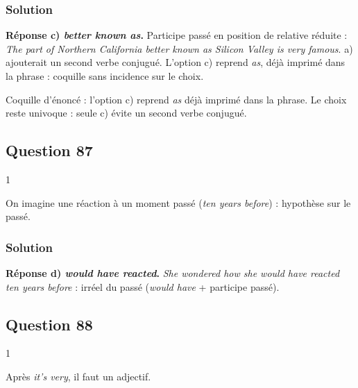 \documentclass[11pt,a4paper]{article}
\begin{document}
\hypertarget{solution-85}{%
\subsubsection{Solution}\label{solution-85}}

\textbf{Réponse c) \emph{better known as}.} Participe passé en position de relative réduite : \emph{The part of Northern California better known as Silicon Valley is very famous}. a) ajouterait un second verbe conjugué. L'option c) reprend \emph{as}, déjà imprimé dans la phrase : coquille sans incidence sur le choix.

\begin{piege}

Coquille d'énoncé : l'option c) reprend \emph{as} déjà imprimé dans la phrase. Le choix reste univoque : seule c) évite un second verbe conjugué.

\end{piege}

\hypertarget{question-87}{%
\subsection{Question 87}\label{question-87}}

\begin{indication}{1}

On imagine une réaction à un moment passé (\emph{ten years before}) : hypothèse sur le passé.

\end{indication}

\hypertarget{solution-86}{%
\subsubsection{Solution}\label{solution-86}}

\textbf{Réponse d) \emph{would have reacted}.} \emph{She wondered how she would have reacted ten years before} : irréel du passé (\emph{would have} + participe passé).

\hypertarget{question-88}{%
\subsection{Question 88}\label{question-88}}

\begin{indication}{1}

Après \emph{it's very}, il faut un adjectif.

\end{indication}
\end{document}
